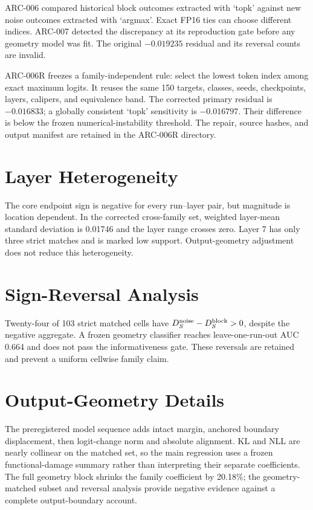 ARC-006 compared historical block outcomes extracted with `topk' against new
noise outcomes extracted with `argmax'. Exact FP16 ties can choose different
indices. ARC-007 detected the discrepancy at its reproduction gate before any
geometry model was fit. The original $-0.019235$ residual and its reversal
counts are invalid.

ARC-006R freezes a family-independent rule: select the lowest token index among
exact maximum logits. It reuses the same 150 targets, classes, seeds,
checkpoints, layers, calipers, and equivalence band. The corrected primary
residual is $-0.016833$; a globally consistent `topk' sensitivity is
$-0.016797$. Their difference is below the frozen numerical-instability
threshold. The repair, source hashes, and output manifest are retained in the
ARC-006R directory.

\section{Layer Heterogeneity}

The core endpoint sign is negative for every run--layer pair, but magnitude is
location dependent. In the corrected cross-family set, weighted layer-mean
standard deviation is 0.01746 and the layer range crosses zero. Layer 7 has
only three strict matches and is marked low support. Output-geometry adjustment
does not reduce this heterogeneity.

\section{Sign-Reversal Analysis}

Twenty-four of 103 strict matched cells have
$D_S^{\rm noise}-D_S^{\rm block}>0$, despite the negative aggregate. A frozen
geometry classifier reaches leave-one-run-out AUC 0.664 and does not pass the
informativeness gate. These reversals are retained and prevent a uniform
cellwise family claim.

\section{Output-Geometry Details}

The preregistered model sequence adds intact margin, anchored boundary
displacement, then logit-change norm and absolute alignment. KL and NLL are
nearly collinear on the matched set, so the main regression uses a frozen
functional-damage summary rather than interpreting their separate
coefficients. The full geometry block shrinks the family coefficient by
20.18\%; the geometry-matched subset and reversal analysis provide negative
evidence against a complete output-boundary account.

